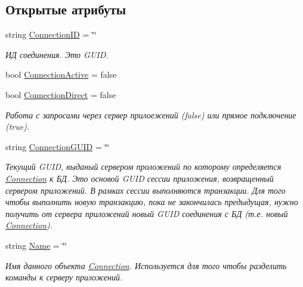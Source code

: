 \subsection*{Открытые атрибуты}
\begin{DoxyCompactItemize}
\item 
string \mbox{\hyperlink{class_f_b_a_1_1_connection_ad362a30163e3a237460e0d5b2cb124d2}{Connection\+ID}} = \char`\"{}\char`\"{}
\begin{DoxyCompactList}\small\item\em ИД соединения. Это G\+U\+ID. \end{DoxyCompactList}\item 
bool \mbox{\hyperlink{class_f_b_a_1_1_connection_ae89cedd48e08f769139faa24d29941aa}{Connection\+Active}} = false
\item 
bool \mbox{\hyperlink{class_f_b_a_1_1_connection_a7e224aeb6f3f7aa7fa641f2bd9330520}{Connection\+Direct}} = false
\begin{DoxyCompactList}\small\item\em Работа с запросами через сервер прилоежений (false) или прямое подключение (true). ~\newline
\end{DoxyCompactList}\item 
string \mbox{\hyperlink{class_f_b_a_1_1_connection_a3cd37446a3a7203f48d984526b4849e5}{Connection\+G\+U\+ID}} = \char`\"{}\char`\"{}
\begin{DoxyCompactList}\small\item\em Текущий G\+U\+ID, выданый сервером проложений по которому определяется \mbox{\hyperlink{class_f_b_a_1_1_connection}{Connection}} к БД. Это основой G\+U\+ID сессии приложения, возвращенный сервером приложений. В рамках сессии выполняются транзакции. Для того чтобы выполнить новую транзакцию, пока не закончилась предыдущая, нужно получить от сервера приложений новый G\+U\+ID соединения с БД (т.\+е. новый \mbox{\hyperlink{class_f_b_a_1_1_connection}{Connection}}). \end{DoxyCompactList}\item 
string \mbox{\hyperlink{class_f_b_a_1_1_connection_ad06450c04a115c5f49848d0bc861b63e}{Name}} = \char`\"{}\char`\"{}
\begin{DoxyCompactList}\small\item\em Имя данного объекта \mbox{\hyperlink{class_f_b_a_1_1_connection}{Connection}}. Используется для того чтобы разделить команды к серверу приложений. \end{DoxyCompactList}\item 

\end{DoxyCompactItemize}
